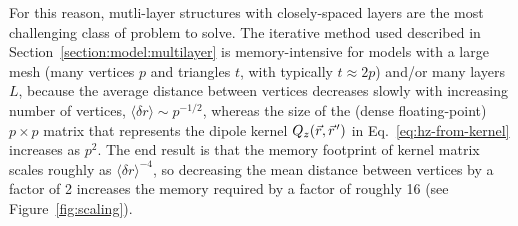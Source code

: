 \documentclass[final,3p,times,twocolumn]{elsarticle}
\newcommand{\pvec}[1]{\vec{#1}\mkern2mu\vphantom{#1}}
\begin{document}
For this reason, mutli-layer structures with closely-spaced layers are the most challenging class of problem to solve. The iterative method used described in Section~\ref{section:model:multilayer} is memory-intensive for models with a large mesh (many vertices $p$ and triangles $t$, with typically $t\approx 2p$) and/or many layers $L$, because the average distance between vertices decreases slowly with increasing number of vertices, $\langle\delta r\rangle\sim p^{-1/2}$, whereas the size of the (dense floating-point) $p\times p$ matrix that represents the dipole kernel $Q_z(\vec{r},\pvec{r}')$ in Eq.~\ref{eq:hz-from-kernel} increases as $p^2$. The end result is that the memory footprint of kernel matrix scales roughly as $\langle\delta r\rangle^{-4}$, so decreasing the mean distance between vertices by a factor of 2 increases the memory required by a factor of roughly 16 (see Figure~\ref{fig:scaling}).
\end{document}
